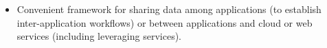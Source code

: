 \begin{frame}{}
{\begin{minipage}{\textwidth}
{\begin{minipage}{.98\textwidth}
{\begin{minipage}{.95\textwidth}
{{\begin{itemize}
sets. \vspace{.5em} 
\item {\lsep} \parbox[t]{17cm}{
	Convenient framework for sharing data 
among applications (to establish inter-application 
workflows) or between applications and cloud 
or web services (including leveraging  services).
}
 \vspace{1.5em}
\end{itemize}%
}
}
\end{minipage}}\end{minipage}}
\end{minipage}}
\end{frame}
